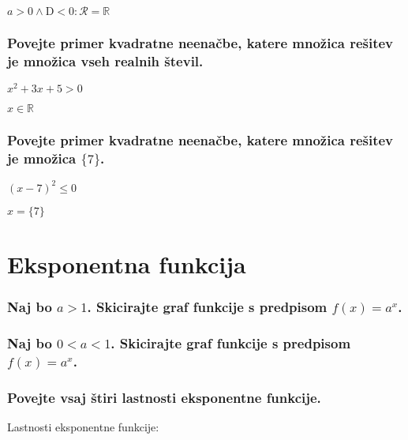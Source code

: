 \documentclass{article}
\begin{document}
$a>0 \wedge \mathrm{D}<0: \mathcal{R}=\mathbb{R}$

\subsubsection*{Povejte primer kvadratne neenačbe, katere množica rešitev je množica vseh realnih števil.}

$x^{2}+3 x+5>0$

$x \in \mathbb{R}$

\subsubsection*{Povejte primer kvadratne neenačbe, katere množica rešitev je množica $\{7\}$.}

$(x-7)^{2} \leq 0$

$x=\{7\}$

\section{Eksponentna funkcija}
\subsubsection*{Naj bo $a>1$. Skicirajte graf funkcije s predpisom $f(x)=a^{x}$.}



\subsubsection*{Naj bo $0<a<1$. Skicirajte graf funkcije s predpisom $f(x)=a^{x}$.}


\subsubsection*{Povejte vsaj štiri lastnosti eksponentne funkcije.}

Lastnosti eksponentne funkcije:
\end{document}
